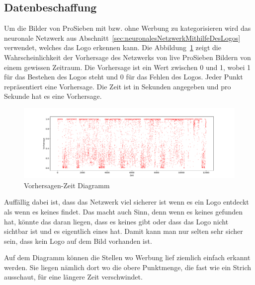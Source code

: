 \documentclass[12pt,a4paper]{report}
\begin{document}
\subsection{Datenbeschaffung}\label{subsec:datenbeschaffung}
Um die Bilder von ProSieben mit bzw. ohne Werbung zu kategorisieren wird das neuronale Netzwerk aus Abschnitt~\ref{sec:neuronalesNetzwerkMithilfeDesLogos} verwendet,
welches das Logo erkennen kann.
Die Abbildung~\ref{fig:points} zeigt die Wahrscheinlichkeit der Vorhersage des Netzwerks von live ProSieben Bildern von einem gewissen Zeitraum.
Die Vorhersage ist ein Wert zwischen 0 und 1, wobei 1 für das Bestehen des Logos steht und 0 für das Fehlen des Logos.
Jeder Punkt repräsentiert eine Vorhersage.
Die Zeit ist in Sekunden angegeben und pro Sekunde hat es eine Vorhersage.
\begin{figure}[h]%
    \centering
    \includegraphics[width=1.0\textwidth]{assets/python/points.pdf}%
    \caption{Vorhersagen-Zeit Diagramm}%
    \label{fig:points}%
\end{figure}
Auffällig dabei ist, dass das Netzwerk viel sicherer ist wenn es ein Logo entdeckt als wenn es keines findet.
Das macht auch Sinn, denn wenn es keines gefunden hat, könnte das daran liegen,
dass es keines gibt oder dass das Logo nicht sichtbar ist und es eigentlich eines hat.
Damit kann man nur selten sehr sicher sein, dass kein Logo auf dem Bild vorhanden ist.

Auf dem Diagramm können die Stellen wo Werbung lief ziemlich einfach erkannt werden.
Sie liegen nämlich dort wo die obere Punktmenge, die fast wie ein Strich ausschaut, für eine längere Zeit verschwindet.
\end{document}
